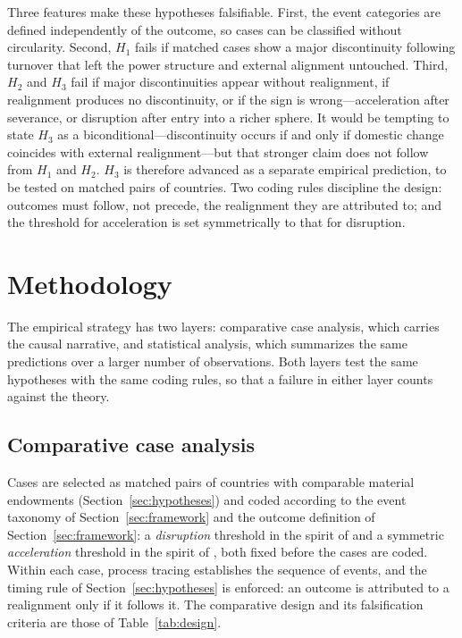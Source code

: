 \documentclass[11pt]{article}
\begin{document}
Three features make these hypotheses falsifiable. First, the event categories are defined independently of the outcome, so cases can be classified without circularity. Second, $H_1$ fails if matched cases show a major discontinuity following turnover that left the power structure and external alignment untouched. Third, $H_2$ and $H_3$ fail if major discontinuities appear without realignment, if realignment produces no discontinuity, or if the sign is wrong---acceleration after severance, or disruption after entry into a richer sphere. It would be tempting to state $H_3$ as a biconditional---discontinuity occurs if and only if domestic change coincides with external realignment---but that stronger claim does not follow from $H_1$ and $H_2$. $H_3$ is therefore advanced as a separate empirical prediction, to be tested on matched pairs of countries. Two coding rules discipline the design: outcomes must follow, not precede, the realignment they are attributed to; and the threshold for acceleration is set symmetrically to that for disruption.

\section{Methodology}
\label{sec:methodology}

The empirical strategy has two layers: comparative case analysis, which carries the causal narrative, and statistical analysis, which summarizes the same predictions over a larger number of observations. Both layers test the same hypotheses with the same coding rules, so that a failure in either layer counts against the theory.

\subsection{Comparative case analysis}

Cases are selected as matched pairs of countries with comparable material endowments (Section~\ref{sec:hypotheses}) and coded according to the event taxonomy of Section~\ref{sec:framework} and the outcome definition of Section~\ref{sec:framework}: a \emph{disruption} threshold in the spirit of \textcite{rodrik_1999} and a symmetric \emph{acceleration} threshold in the spirit of \textcite{hausmann_pritchett_rodrik_2005}, both fixed before the cases are coded. Within each case, process tracing establishes the sequence of events, and the timing rule of Section~\ref{sec:hypotheses} is enforced: an outcome is attributed to a realignment only if it follows it. The comparative design and its falsification criteria are those of Table~\ref{tab:design}.
\end{document}
